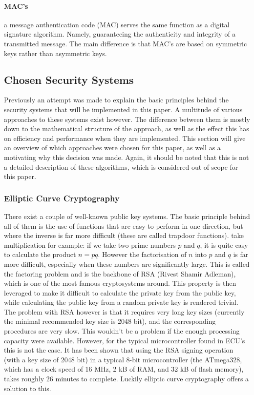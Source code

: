 \documentclass[11pt]{article}
\begin{document}
\paragraph{MAC's} a message authentication code (MAC) serves the same function as a digital signature algorithm. Namely, guaranteeing the authenticity and integrity of a transmitted message. The main difference is that MAC's are based on symmetric keys rather than asymmetric keys. 

\subsection{Chosen Security Systems}
Previously an attempt was made to explain the basic principles behind the security systems that will be implemented in this paper. A multitude of various approaches to these systems exist however. The difference between them is mostly down to the mathematical structure of the approach, as well as the effect this has on efficiency and performance when they are implemented. This section will give an overview of which approaches were chosen for this paper, as well as a motivating why this decision was made. Again, it should be noted that this is not a detailed description of these algorithms, which is considered out of scope for this paper.

\subsubsection{Elliptic Curve Cryptography}
There exist a couple of well-known public key systems. The basic principle behind all of them is the use of functions that are easy to perform in one direction, but where the inverse is far more difficult (these are called trapdoor functions). take multiplication for example: if we take two prime numbers $p$ and $q$, it is quite easy to calculate the product $ n=pq $. However the factorisation of $n$ into $p$ and $q$ is far more difficult, especially when these numbers are significantly large. This is called the factoring problem and is the backbone of RSA (Rivest Shamir Adleman), which is one of the most famous cryptosystems around. This property is then leveraged to make it difficult to calculate the private key from the public key, while calculating the public key from a random private key is rendered trivial. The problem with RSA however is that it requires very long key sizes (currently the minimal recommended key size is 2048 bit), and the corresponding procedures are very slow. This wouldn't be a problem if the enough processing capacity were available. However, for the typical microcontroller found in ECU's this is not the case. It has been shown that using the RSA signing operation (with a key size of 2048 bit) in a typical 8-bit microcontroller (the ATmega328, which has a clock speed of 16 MHz, 2 kB of RAM, and 32 kB of flash memory), takes roughly 26 minutes to complete\cite{Sethi}. Luckily elliptic curve cryptography offers a solution to this.
\end{document}
